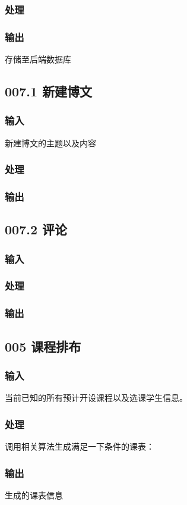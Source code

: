     \subsubsection{处理}

    \subsubsection{输出}
    存储至后端数据库

  \subsection{007.1 新建博文}
    \subsubsection{输入}
    新建博文的主题以及内容
    \subsubsection{处理}
    \subsubsection{输出}

  \subsection{007.2 评论}
    \subsubsection{输入}
    \subsubsection{处理}
    \subsubsection{输出}

  \subsection{005 课程排布}
    \subsubsection{输入}
    当前已知的所有预计开设课程以及选课学生信息。
    \subsubsection{处理}
    调用相关算法生成满足一下条件的课表：
    \subsubsection{输出}
    生成的课表信息
